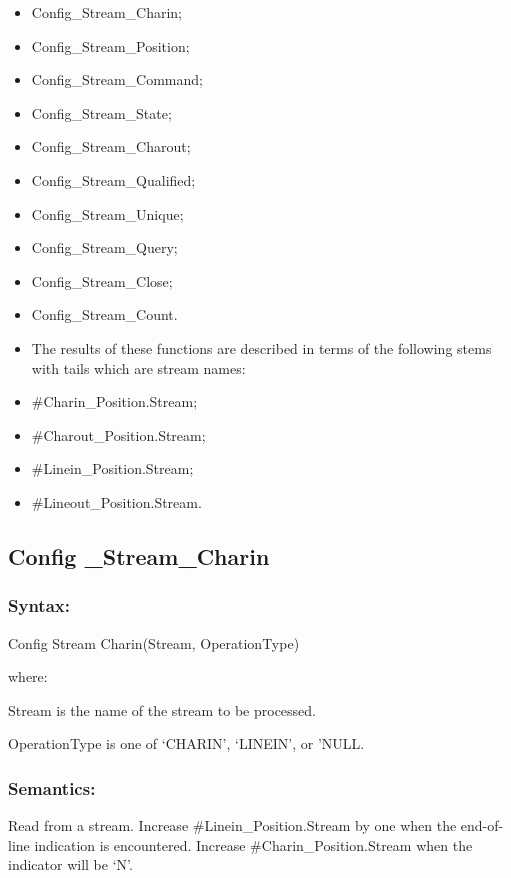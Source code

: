 \begin{itemize}
\item
  Config\_Stream\_Charin;
\item
  Config\_Stream\_Position;
\item
  Config\_Stream\_Command;
\item
  Config\_Stream\_State;
\item
  Config\_Stream\_Charout;
\item
  Config\_Stream\_Qualified;
\item
  Config\_Stream\_Unique;
\item
  Config\_Stream\_Query;
\item
  Config\_Stream\_Close;
\item
  Config\_Stream\_Count.
\item
  The results of these functions are described in terms of the following
  stems with tails which are stream names:
\item
  \#Charin\_Position.Stream;
\item
  \#Charout\_Position.Stream;
\item
  \#Linein\_Position.Stream;
\item
  \#Lineout\_Position.Stream.
\end{itemize}

\subsection{Config \_Stream\_Charin}\label{config-_stream_charin}

\subsubsection{Syntax:}\label{syntax-23}

Config Stream Charin(Stream, OperationType)

where:

Stream is the name of the stream to be processed.

OperationType is one of `CHARIN', `LINEIN', or 'NULL.

\subsubsection{Semantics:}\label{semantics-24}

Read from a stream. Increase \#Linein\_Position.Stream by one when the
end-of-line indication is encountered. Increase
\#Charin\_Position.Stream when the indicator will be `N'.

